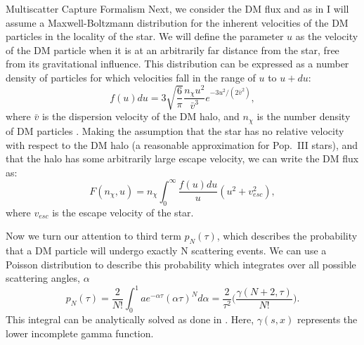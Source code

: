 \documentclass[a4paper,11pt]{article}
\newcommand{\vbar}{\bar{v}}
\begin{document}
\begin{section}{Multiscatter Capture Formalism}
    Next, we consider the DM flux and as in \cite{Ilie:2019} I will assume a Maxwell-Boltzmann distribution for the inherent velocities of the DM particles in the locality of the star.
    We will define the parameter $u$ as the velocity of the DM particle when it is at an arbitrarily far distance from the star, free from its gravitational influence.
    This distribution can be expressed as a number density of particles for which velocities fall in the range of $u$ to $u+du$:
    \begin{equation}
    f(u)du = 3\sqrt{\frac{6}{\pi}} \frac{n_{\chi}u^2}{\vbar^3} e^{-3u^2/(2\vbar^2)},
    \end{equation}
    where $\vbar$ is the dispersion velocity of the DM halo, and $n_{\chi}$ is the number density of DM particles \cite{Bramante:2017}.
    Making the assumption that the star has no relative velocity with respect to the DM halo (a reasonable approximation for Pop.~III stars), and that the halo has some arbitrarily large escape velocity, we can write the DM flux as:
    \begin{equation}
    F(n_{\chi}, u) =n_{\chi} \int_{0}^{\infty} \frac{f(u)du}{u} (u^2 + v^2_{esc}),
    \end{equation}
    where $v_{esc}$ is the escape velocity of the star.

    Now we turn our attention to third term $p_N(\tau)$, which describes the probability that a DM particle will undergo exactly N scattering events.
    We can use a Poisson distribution to describe this probability which integrates over all possible scattering angles, $\alpha$
    \begin{equation}
        p_N(\tau) = \frac{2}{N!}\int_{0}^{1} ae^{-\alpha \tau} (\alpha \tau )^N d\alpha = \frac{2}{\tau^2}\Big(\frac{\gamma(N + 2, \tau)}{N!} \Big).
        \label{pnt}
    \end{equation}
    This integral can be analytically solved as done in \cite{Bramante:2017} \cite{Ilie:2019}. Here, $\gamma(s,x)$ represents the lower incomplete gamma function. 


\end{section}
\end{document}
